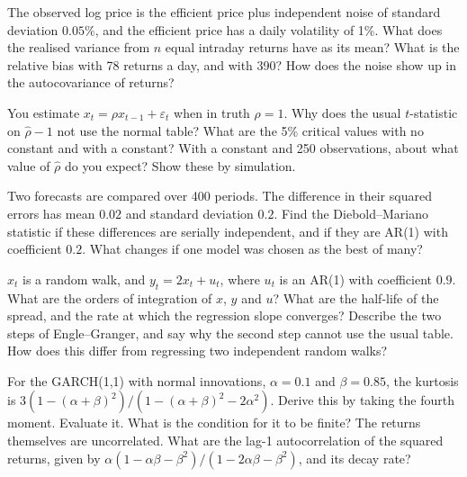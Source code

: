 \begin{question}\label{iq:iv1:time-series:10}
The observed log price is the efficient price plus independent noise of standard deviation $0.05\%$, and the efficient price has a daily volatility of 1\%. What does the realised variance from $n$ equal intraday returns have as its mean? What is the relative bias with 78 returns a day, and with 390? How does the noise show up in the autocovariance of returns?
\end{question}

\begin{question}\label{iq:iv1:time-series:11}
You estimate $x_t = \rho x_{t-1} + \varepsilon_t$ when in truth $\rho = 1$. Why does the usual $t$-statistic on $\hat{\rho} - 1$ not use the normal table? What are the 5\% critical values with no constant and with a constant? With a constant and 250 observations, about what value of $\hat{\rho}$ do you expect? Show these by simulation.
\end{question}

\begin{question}\label{iq:iv1:time-series:12}
Two forecasts are compared over 400 periods. The difference in their squared errors has mean $0.02$ and standard deviation $0.2$. Find the Diebold--Mariano statistic if these differences are serially independent, and if they are AR(1) with coefficient $0.2$. What changes if one model was chosen as the best of many?
\end{question}

\begin{question}\label{iq:iv1:time-series:13}
$x_t$ is a random walk, and $y_t = 2x_t + u_t$, where $u_t$ is an AR(1) with coefficient $0.9$. What are the orders of integration of $x$, $y$ and $u$? What are the half-life of the spread, and the rate at which the regression slope converges? Describe the two steps of Engle--Granger, and say why the second step cannot use the usual table. How does this differ from regressing two independent random walks?
\end{question}

\begin{question}\label{iq:iv1:time-series:14}
For the GARCH(1,1) with normal innovations, $\alpha = 0.1$ and $\beta = 0.85$, the kurtosis is $3(1 - (\alpha + \beta)^2)/(1 - (\alpha + \beta)^2 - 2\alpha^2)$. Derive this by taking the fourth moment. Evaluate it. What is the condition for it to be finite? The returns themselves are uncorrelated. What are the lag-1 autocorrelation of the squared returns, given by $\alpha(1 - \alpha\beta - \beta^2)/(1 - 2\alpha\beta - \beta^2)$, and its decay rate?
\end{question}

